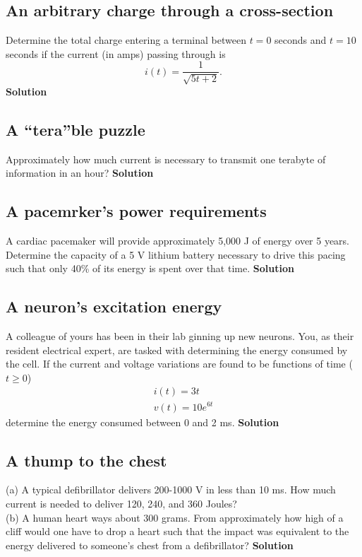 \documentclass[11pt]{book}
\begin{document}
\subsection{An arbitrary charge through a cross-section}
Determine the total charge entering a terminal between $t = 0$ seconds and $t = 10$ seconds if the current (in amps) passing through is
\begin{equation}
	i(t) = \frac{1}{\sqrt{5t+2}}. 
\end{equation} 
\textbf{Solution}


\subsection{A ``tera''ble puzzle}
Approximately how much current is necessary to transmit one terabyte of information in an hour?
\textbf{Solution}


\subsection{A pacemrker's power requirements}
A cardiac pacemaker will provide approximately 5,000 J of energy over 5 years. Determine the capacity of a 5 V lithium battery necessary to drive this pacing such that only 40\% of its energy is spent over that time.
\textbf{Solution}


\subsection{A neuron's excitation energy}
A colleague of yours has been in their lab ginning up new neurons. You, as their resident electrical expert, are tasked with determining the energy consumed by the cell. If the current and voltage variations are found to be functions of time ($t \geq 0$)
\begin{eqnarray}
	i(t) = 3t \\
	v(t) = 10 e^{6t}
\end{eqnarray}
determine the energy consumed between 0 and 2 ms.
\textbf{Solution}


\subsection{A thump to the chest}
(a) A typical defibrillator delivers 200-1000 V in less than 10 ms. How much current is needed to deliver 120, 240, and 360 Joules?
\\
(b) A human heart ways about 300 grams. From approximately how high of a cliff would one have to drop a heart such that the impact was equivalent to the energy delivered to someone's chest from a defibrillator?
\textbf{Solution}
\end{document}
